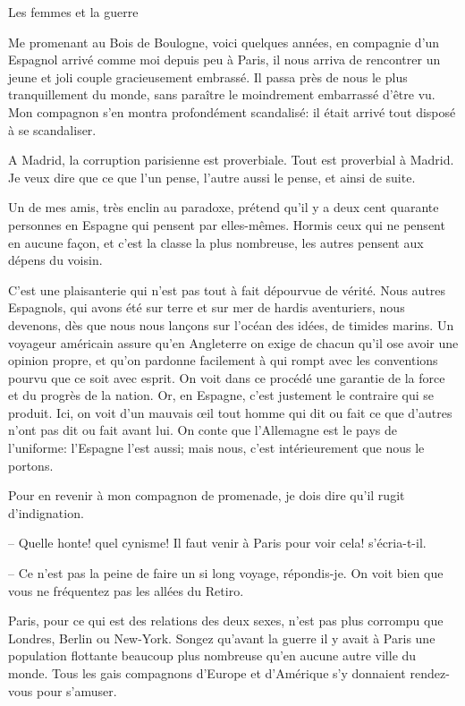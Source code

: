 \begin{chapter}{Les femmes et la guerre}

Me promenant au Bois de Boulogne, voici quelques années, en compagnie
d'un Espagnol arrivé comme moi depuis peu à Paris, il nous arriva de
rencontrer un jeune et joli couple gracieusement embrassé. Il passa près
de nous le plus tranquillement du monde, sans paraître le moindrement
embarrassé d'être vu. Mon compagnon s'en montra profondément scandalisé:
il était arrivé tout disposé à se scandaliser.

A Madrid, la corruption parisienne est proverbiale. Tout est proverbial
à Madrid. Je veux dire que ce que l'un pense, l'autre aussi le pense, et
ainsi de suite.

Un de mes amis, très enclin au paradoxe, prétend qu'il y a deux cent
quarante personnes en Espagne qui pensent par elles-mêmes. Hormis ceux
qui ne pensent en aucune façon, et c'est la classe la plus nombreuse,
les autres pensent aux dépens du voisin.

C'est une plaisanterie qui n'est pas tout à fait dépourvue de vérité.
Nous autres Espagnols, qui avons été sur terre et sur mer de hardis
aventuriers, nous devenons, dès que nous nous lançons sur l'océan des
idées, de timides marins. Un voyageur américain assure qu'en Angleterre
on exige de chacun qu'il ose avoir une opinion propre, et qu'on pardonne
facilement à qui rompt avec les conventions pourvu que ce soit avec
esprit. On voit dans ce procédé une garantie de la force et du progrès
de la nation. Or, en Espagne, c'est justement le contraire qui se
produit. Ici, on voit d'un mauvais œil tout homme qui dit ou fait ce
que d'autres n'ont pas dit ou fait avant lui. On conte que l'Allemagne
est le pays de l'uniforme: l'Espagne l'est aussi; mais nous, c'est
intérieurement que nous le portons.

Pour en revenir à mon compagnon de promenade, je dois dire qu'il rugit
d'indignation.

-- Quelle honte! quel cynisme! Il faut venir à Paris pour voir cela!
s'écria-t-il.

-- Ce n'est pas la peine de faire un si long voyage, répondis-je. On voit
bien que vous ne fréquentez pas les allées du Retiro.

Paris, pour ce qui est des relations des deux sexes, n'est pas plus
corrompu que Londres, Berlin ou New-York. Songez qu'avant la guerre il y
avait à Paris une population flottante beaucoup plus nombreuse qu'en
aucune autre ville du monde. Tous les gais compagnons d'Europe et
d'Amérique s'y donnaient rendez-vous pour s'amuser.


\end{chapter}
